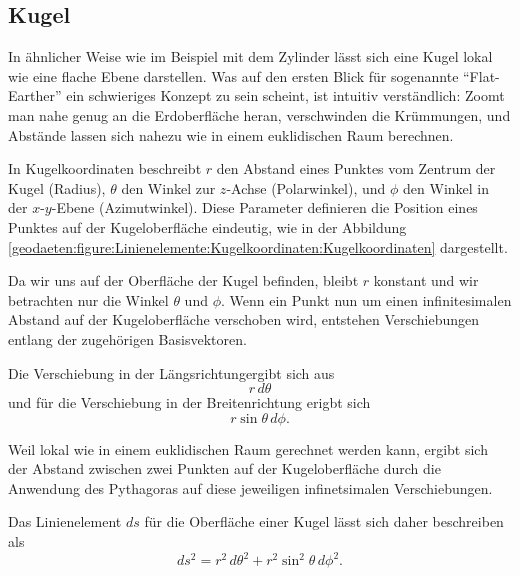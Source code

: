 %
%
%
%
\subsection{Kugel\label{geodaeten:section:Linienelement:Kugel}}

In ähnlicher Weise wie im Beispiel mit dem Zylinder lässt sich eine Kugel lokal wie eine flache Ebene darstellen.
Was auf den ersten Blick für sogenannte ``Flat-Earther'' ein schwieriges Konzept zu sein scheint, ist intuitiv verständlich:
Zoomt man nahe genug an die Erdoberfläche heran, verschwinden die Krümmungen, und Abstände lassen sich nahezu wie in einem euklidischen Raum berechnen.

In Kugelkoordinaten beschreibt $r$ den Abstand eines Punktes vom Zentrum der Kugel (Radius), $\theta$ den Winkel zur $z$-Achse (Polarwinkel), und $\phi$ den Winkel in der $x$-$y$-Ebene (Azimutwinkel).
Diese Parameter definieren die Position eines Punktes auf der Kugeloberfläche eindeutig, wie in der Abbildung \ref{geodaeten:figure:Linienelemente:Kugelkoordinaten:Kugelkoordinaten} dargestellt.

Da wir uns auf der Oberfläche der Kugel befinden, bleibt $r$ konstant und wir betrachten nur die Winkel $\theta$ und $\phi$.
Wenn ein Punkt nun um einen infinitesimalen Abstand auf der Kugeloberfläche verschoben wird, entstehen Verschiebungen entlang der zugehörigen Basisvektoren. 

Die Verschiebung in der Längsrichtungergibt sich aus
\begin{equation}
	r \, d\theta
\end{equation}
und für die Verschiebung in der Breitenrichtung erigbt sich
\begin{equation}
	r \sin\theta \, d\phi.
\end{equation}

Weil lokal wie in einem euklidischen Raum gerechnet werden kann, ergibt sich der Abstand zwischen zwei Punkten auf der Kugeloberfläche durch die Anwendung des Pythagoras auf diese jeweiligen infinetsimalen Verschiebungen. 

Das Linienelement $ds$ für die Oberfläche einer Kugel lässt sich daher beschreiben als
\begin{equation}
ds^2 = r^2 \, d\theta^2 + r^2 \sin^2\theta \, d\phi^2.
\end{equation}


